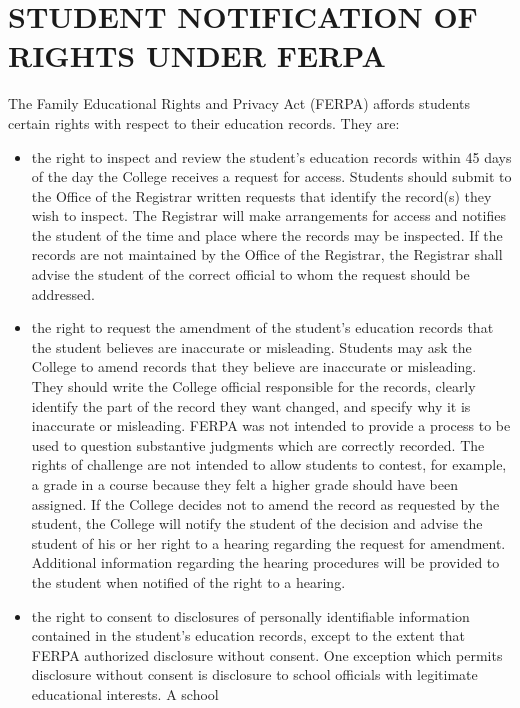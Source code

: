 \documentclass[
  letterpaper,
]{scrbook}
\providecommand{\tightlist}{%
  \setlength{\itemsep}{0pt}\setlength{\parskip}{0pt}}
\begin{document}
\chapter{STUDENT NOTIFICATION OF RIGHTS UNDER
FERPA}\label{sec-ferpa-rights}

The Family Educational Rights and Privacy Act (FERPA) affords students
certain rights with respect to their education records. They are:

\begin{itemize}
\tightlist
\item
  the right to inspect and review the student's education records within
  45 days of the day the College receives a request for access. Students
  should submit to the Office of the Registrar written requests that
  identify the record(s) they wish to inspect. The Registrar will make
  arrangements for access and notifies the student of the time and place
  where the records may be inspected. If the records are not maintained
  by the Office of the Registrar, the Registrar shall advise the student
  of the correct official to whom the request should be addressed.
\item
  the right to request the amendment of the student's education records
  that the student believes are inaccurate or misleading. Students may
  ask the College to amend records that they believe are inaccurate or
  misleading. They should write the College official responsible for the
  records, clearly identify the part of the record they want changed,
  and specify why it is inaccurate or misleading. FERPA was not intended
  to provide a process to be used to question substantive judgments
  which are correctly recorded. The rights of challenge are not intended
  to allow students to contest, for example, a grade in a course because
  they felt a higher grade should have been assigned. If the College
  decides not to amend the record as requested by the student, the
  College will notify the student of the decision and advise the student
  of his or her right to a hearing regarding the request for amendment.
  Additional information regarding the hearing procedures will be
  provided to the student when notified of the right to a hearing.
\item
  the right to consent to disclosures of personally identifiable
  information contained in the student's education records, except to
  the extent that FERPA authorized disclosure without consent. One
  exception which permits disclosure without consent is disclosure to
  school officials with legitimate educational interests. A school

\end{itemize}
\end{document}
